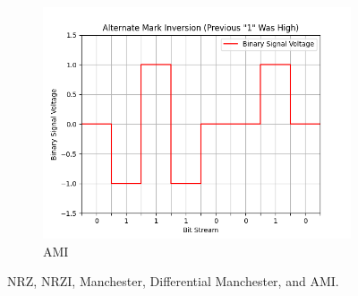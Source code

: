\documentclass{article}
\begin{document}
\begin{figure}[H]
        \begin{subfigure}{0.7\textwidth}
            \centering
            \includegraphics[width=\linewidth]{ami}
            \caption{AMI}
        \end{subfigure}

        \caption{NRZ, NRZI, Manchester, Differential Manchester, and AMI.}
    \end{figure}
\end{document}
